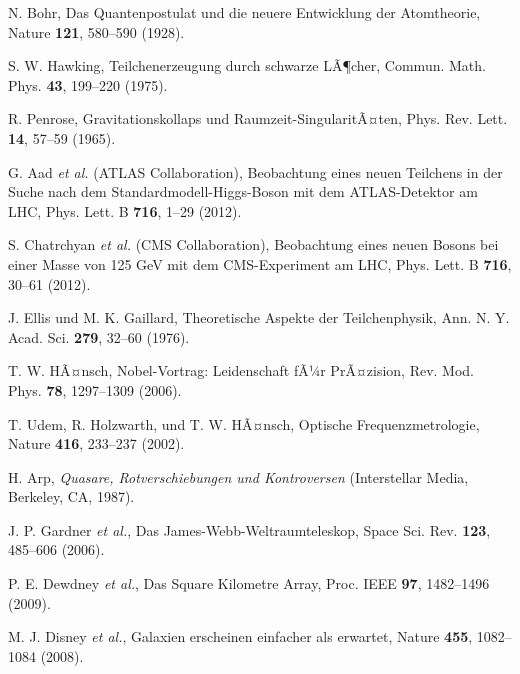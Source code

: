 ﻿\documentclass[twocolumn,aps,prl]{revtex4-2}
\begin{document}
{{{{{{{{{{{{{{{{\begin{thebibliography}{99}
																				 N. Bohr, Das Quantenpostulat und die neuere Entwicklung der Atomtheorie, Nature \textbf{121}, 580--590 (1928).
																				
																				 S. W. Hawking, Teilchenerzeugung durch schwarze LÃ¶cher, Commun. Math. Phys. \textbf{43}, 199--220 (1975).
																				
																				 R. Penrose, Gravitationskollaps und Raumzeit-SingularitÃ¤ten, Phys. Rev. Lett. \textbf{14}, 57--59 (1965).
																				
																				 G. Aad \textit{et al.} (ATLAS Collaboration), Beobachtung eines neuen Teilchens in der Suche nach dem Standardmodell-Higgs-Boson mit dem ATLAS-Detektor am LHC, Phys. Lett. B \textbf{716}, 1--29 (2012).
																				
																				 S. Chatrchyan \textit{et al.} (CMS Collaboration), Beobachtung eines neuen Bosons bei einer Masse von 125 GeV mit dem CMS-Experiment am LHC, Phys. Lett. B \textbf{716}, 30--61 (2012).
																				
																				 J. Ellis und M. K. Gaillard, Theoretische Aspekte der Teilchenphysik, Ann. N. Y. Acad. Sci. \textbf{279}, 32--60 (1976).
																				
																				 T. W. HÃ¤nsch, Nobel-Vortrag: Leidenschaft fÃ¼r PrÃ¤zision, Rev. Mod. Phys. \textbf{78}, 1297--1309 (2006).
																				
																				 T. Udem, R. Holzwarth, und T. W. HÃ¤nsch, Optische Frequenzmetrologie, Nature \textbf{416}, 233--237 (2002).
																				
																				 H. Arp, \textit{Quasare, Rotverschiebungen und Kontroversen} (Interstellar Media, Berkeley, CA, 1987).
																				
																				 J. P. Gardner \textit{et al.}, Das James-Webb-Weltraumteleskop, Space Sci. Rev. \textbf{123}, 485--606 (2006).
																				
																				 P. E. Dewdney \textit{et al.}, Das Square Kilometre Array, Proc. IEEE \textbf{97}, 1482--1496 (2009).
																				
																				 M. J. Disney \textit{et al.}, Galaxien erscheinen einfacher als erwartet, Nature \textbf{455}, 1082--1084 (2008).
																				

\end{thebibliography}}}}}}}}}}}}}}}}}
\end{document}
